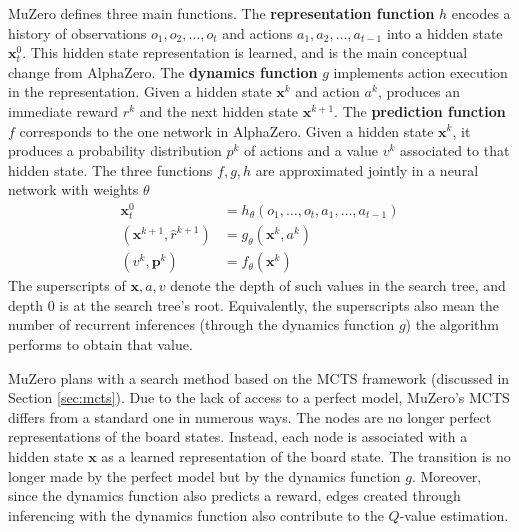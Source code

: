 
MuZero defines three main functions.
The \textbf{representation function} $h$ encodes a history of observations $o_1, o_2, \dots, o_t$ and actions $a_1, a_2, \dots, a_{t - 1}$ into a hidden state $\mathbf{x}_t^0$.
This hidden state representation is learned, and is the main conceptual change from AlphaZero.
The \textbf{dynamics function} $g$ implements action execution in the representation.
Given a hidden state $\mathbf{x}^k$ and action $a^k$, produces an immediate reward $r^k$ and the next hidden state $\mathbf{x}^{k+1}$.
The \textbf{prediction function} $f$ corresponds to the one network in AlphaZero.
Given a hidden state $\mathbf{x}^k$, it produces a probability distribution $p^k$ of actions and a value $v^k$ associated to that hidden state.
The three functions $f, g, h$ are approximated jointly in a neural network with weights $\theta$
\begin{align}
    \mathbf{x}^0_t                     & = h_{\theta}(o_1, \dots, o_t, a_1, \dots, a_{t - 1}) \label{eq:muzero_h}  \\
    (\mathbf{x}^{k+1}, \hat{r}^{k+1})  & = g_{\theta}(\mathbf{x}^k, a^k)  \label{eq:muzero_g}  \\
    (v^k, \pmb{p}^k)                   & = f_{\theta}(\mathbf{x}^k) \label{eq:muzero_f}
\end{align}
The superscripts of $\mathbf{x}, a, v$ denote the depth of such values in the search tree, and depth $0$ is at the search tree's root.
Equivalently, the superscripts also mean the number of recurrent inferences (through the dynamics function $g$) the algorithm performs to obtain that value.

MuZero plans with a search method based on the MCTS framework (discussed in Section \ref{sec:mcts}).
Due to the lack of access to a perfect model, MuZero's MCTS differs from a standard one in numerous ways.
The nodes are no longer perfect representations of the board states.
Instead, each node is associated with a hidden state $\mathbf{x}$ as a learned representation of the board state.
The transition is no longer made by the perfect model but by the dynamics function $g$.
Moreover, since the dynamics function also predicts a reward, edges created through inferencing with the dynamics function also contribute to the $Q$-value estimation.

